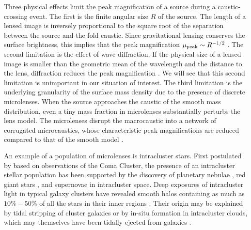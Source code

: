\documentclass{aastex6}
\begin{document}
Three physical effects limit the peak magnification of a source during a caustic-crossing 
event. The first is the finite angular size $R$ of the source. The length of a lensed image 
is inversely proportional to the square root of the separation between the source and 
the fold caustic. Since gravitational lensing conserves the surface 
brightness, this implies that the peak magnification $\mu_{\rm peak} \sim R^{-1/2}$
\citep{1987A&A...171...49S}. The second limitation is the effect of wave diffraction. If the physical 
size of a lensed image is smaller than the geometric mean of the wavelength and 
the distance to the lens, diffraction reduces the peak magnification \citep{1983ApJ...271..551O}. 
We will see that this second limitation is unimportant in our situation of interest. The third limitation 
is the underlying granularity of the surface mass density due to the presence of discrete microlenses. 
When the source approaches the caustic of the smooth mass distribution, even a tiny mass 
fraction in microlenses substantially perturbs the lens model. The microlenses disrupt the 
macrocaustic into a network of corrugated microcaustics, whose characteristic peak 
magnifications are reduced compared to that of the smooth model 
\citep{1990LNP...360..186W, 1996IAUS..173..355B}.

An example of a population of microlenses is intracluster stars.  First postulated by 
\cite{1951PASP...63...61Z} based on observations of the Coma Cluster, the presence of 
an intracluster stellar population has been supported by the discovery of planetary nebulae
\citep{1996ApJ...472..145A,1998ApJ...492...62C}, red giant stars \citep{1998Natur.391..461F}, 
and supernovae \citep{2003AJ....125.1087G} in intracluster space. Deep exposures of 
intracluster light in typical galaxy clusters have revealed smooth halos containing as much as 
$10\%-50\%$ of all the stars in their inner regions \citep{2004ApJ...617..879L,2005MNRAS.358..949Z}.
Their origin may be explained by tidal stripping of cluster galaxies or by in-situ formation in intracluster clouds, which may themselves have been tidally ejected from galaxies \citep{Martel:2012ue,Contini:2013wha,Cooper:2014nwa}.
\end{document}
